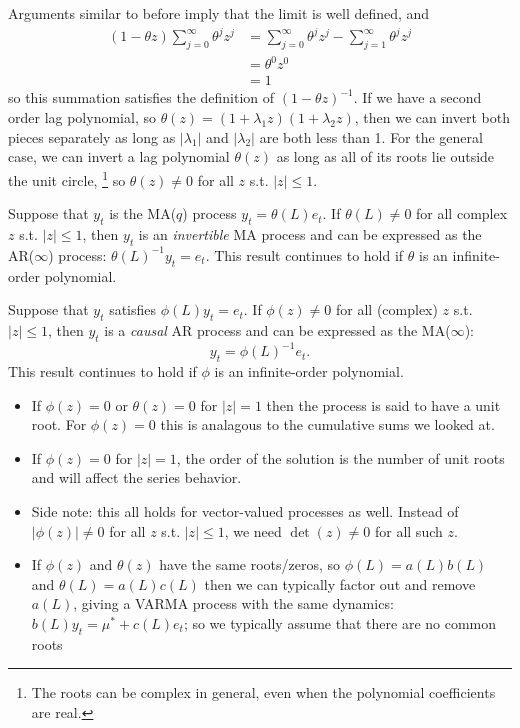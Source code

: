 Arguments similar to before imply that the limit is well defined, and
\begin{align*}
  (1 - \theta z) \sum_{j=0}^\infty \theta^j z^j
  &= \sum_{j=0}^\infty \theta^j z^j - \sum_{j=1}^\infty \theta^j z^j \\
  &= \theta^0 z^0 \\
  &= 1
\end{align*}
so this summation satisfies the definition of $(1 - \theta z)^{-1}$.
If we have a second order lag polynomial, so
$\theta(z) = (1 + \lambda_1 z) (1 + \lambda_2 z)$, then we can invert
both pieces separately as long as $|\lambda_1|$ and $|\lambda_2|$ are
both less than 1. For the general case, we can invert a lag polynomial
$\theta(z)$ as long as all of its roots lie outside the unit circle,%
\footnote{The roots can be complex in general, even when the polynomial
  coefficients are real.} %
so $\theta(z) \neq 0$ for all $z$ s.t. $|z| \leq 1$.

\begin{defn}
  Suppose that $y_t$ is the MA($q$) process $y_t = \theta(L) e_t$. If
  $\theta(L) \neq 0$ for all complex $z$ s.t. $|z| \leq 1$, then $y_t$
  is an \emph{invertible} MA process and can be expressed as the
  AR($\infty$) process: $\theta(L)^{-1} y_t = e_t$. This result
  continues to hold if $\theta$ is an infinite-order polynomial.
\end{defn}

\begin{defn}
  Suppose that $y_t$ satisfies $\phi(L) y_t = e_t$. If $\phi(z) \neq
  0$ for all (complex) $z$ s.t. $|z| \leq 1$, then $y_t$ is a
  \emph{causal} AR process and can be expressed as the MA($\infty$):
  \[y_t = \phi(L)^{-1} e_t.\]
  This result continues to hold if $\phi$ is an infinite-order
  polynomial.
\end{defn}

\begin{itemize}
\item If $\phi(z) = 0$ or $\theta(z) = 0$ for $|z| = 1$ then the
  process is said to have a unit root. For $\phi(z) = 0$ this is
  analagous to the cumulative sums we looked at.
\item If $\phi(z) = 0$ for $|z| = 1$, the order of the solution is the
  number of unit roots and will affect the series behavior.
\item Side note: this all holds for vector-valued processes as
  well. Instead of $|\phi(z)| \neq 0$ for all $z$ s.t. $|z| \leq 1$,
  we need $\det(z) \neq 0$ for all such $z$.
\item If $\phi(z)$ and $\theta(z)$ have the same roots/zeros, so
  $\phi(L) = a(L) b(L)$ and $\theta(L) = a(L) c(L)$ then we can
  typically factor out and remove $a(L)$, giving a VARMA process with
  the same dynamics: $b(L) y_t = \mu^* + c(L) e_t$; so we typically
  assume that there are no common roots
\end{itemize}

